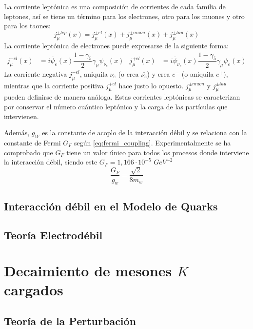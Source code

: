La corriente leptónica es una composición de corrientes de cada familia de leptones, así se tiene un término para los electrones, otro para los muones y otro para los taones:
\begin{equation}
j_{\mu }^{\pm lep}\left( x\right) =j_{\mu }^{\pm el}\left( x\right) +j_{\mu }^{\pm muon}\left( x\right) +j_{\mu} ^{\pm tau}\left( x\right)\label{eq:leptonic_weak_current}
\end{equation}
La corriente leptónica de electrones puede expresarse de la siguiente forma:
\begin{align}
j_{\mu }^{-el}\left(x\right)&=i\overline{\psi}_{e}\left( x\right) \dfrac{1-\gamma_{5}}{2}\gamma _{\mu }\psi_{{ \nu}_{e}}\left( x\right) & j_{\mu}^{+el}\left(x\right)&= i\overline{\psi}_{{\nu}_{e}}\left(x\right) \dfrac{1-\gamma_{5}}{2}\gamma _{\mu}\psi_{e}\left( x\right)\label{eq:electric_weak_current}
\end{align}
La corriente negativa $j_{\mu }^{-el}$, aniquila $\nu_e$ (o crea $\overline{\nu_e}$) y crea $e^-$ (o aniquila $e^+$), mientras que la corriente positiva $j_{\mu }^{+el}$ hace justo lo opuesto. $j_{\mu }^{\pm muon}$ y $j_{\mu }^{\pm tau}$ pueden definirse de manera análoga. Estas corrientes leptónicas se caracterizan por conservar el número cuántico leptónico y la carga de las partículas que intervienen.

Además, $g_W$ es la constante de acoplo de la interacción débil y se relaciona con la constante de Fermi $G_F$ según \ref{eq:fermi_coupling}. Experimentalmente se ha comprobado que $G_F$ tiene un valor único para todos los procesos donde interviene la interacción débil, siendo este $G_{F}=1,166 \cdot 10^{-5}$ $GeV^{−2}$ 
\begin{equation}
\dfrac{G_{F}}{g_{w}}=\dfrac{\sqrt{2}}{8m_{w}}\label{eq:fermi_coupling}
\end{equation}

\subsection{Interacción débil en el Modelo de Quarks}\label{sec:weak_int_quarks}

\subsection{Teoría Electrodébil}\label{sec:electroweak}

\section{Decaimiento de mesones $K$ cargados}
\label{sec:charged_kaon_decay}

\subsection{Teoría de la Perturbación}\label{sec:perturbation_theory}